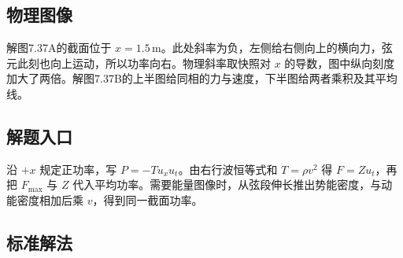 \documentclass[UTF8,fontset=fandol,a4paper,11pt]{ctexart}
\begin{document}


\subsection*{物理图像}

解图7.37A的截面位于 $x=1.5\,\mathrm m$。此处斜率为负，左侧给右侧向上的横向力，弦元此刻也向上运动，所以功率向右。物理斜率取快照对 $x$ 的导数，图中纵向刻度加大了两倍。解图7.37B的上半图给同相的力与速度，下半图给两者乘积及其平均线。




\subsection*{解题入口}

沿 $+x$ 规定正功率，写 $P=-Tu_xu_t$。由右行波恒等式和 $T=\rho v^2$ 得 $F=Zu_t$，再把 $F_{\max}$ 与 $Z$ 代入平均功率。需要能量图像时，从弦段伸长推出势能密度，与动能密度相加后乘 $v$，得到同一截面功率。



\subsection*{标准解法}
\end{document}
